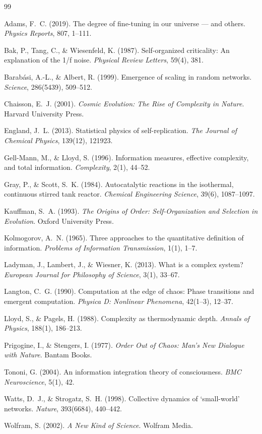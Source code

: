 \documentclass[12pt,a4paper]{article}
\begin{document}
\begin{thebibliography}{99}

Adams, F.~C. (2019).
The degree of fine-tuning in our universe — and others.
\textit{Physics Reports}, 807, 1--111.

Bak, P., Tang, C., \& Wiesenfeld, K. (1987).
Self-organized criticality: An explanation of the 1/f noise.
\textit{Physical Review Letters}, 59(4), 381.

Barab{\'a}si, A.-L., \& Albert, R. (1999).
Emergence of scaling in random networks.
\textit{Science}, 286(5439), 509--512.

Chaisson, E.~J. (2001).
\textit{Cosmic Evolution: The Rise of Complexity in Nature}.
Harvard University Press.

England, J.~L. (2013).
Statistical physics of self-replication.
\textit{The Journal of Chemical Physics}, 139(12), 121923.

Gell-Mann, M., \& Lloyd, S. (1996).
Information measures, effective complexity, and total information.
\textit{Complexity}, 2(1), 44--52.

Gray, P., \& Scott, S.~K. (1984).
Autocatalytic reactions in the isothermal, continuous stirred tank reactor.
\textit{Chemical Engineering Science}, 39(6), 1087--1097.

Kauffman, S.~A. (1993).
\textit{The Origins of Order: Self-Organization and Selection in Evolution}.
Oxford University Press.

Kolmogorov, A.~N. (1965).
Three approaches to the quantitative definition of information.
\textit{Problems of Information Transmission}, 1(1), 1--7.

Ladyman, J., Lambert, J., \& Wiesner, K. (2013).
What is a complex system?
\textit{European Journal for Philosophy of Science}, 3(1), 33--67.

Langton, C.~G. (1990).
Computation at the edge of chaos: Phase transitions and emergent computation.
\textit{Physica D: Nonlinear Phenomena}, 42(1--3), 12--37.

Lloyd, S., \& Pagels, H. (1988).
Complexity as thermodynamic depth.
\textit{Annals of Physics}, 188(1), 186--213.

Prigogine, I., \& Stengers, I. (1977).
\textit{Order Out of Chaos: Man's New Dialogue with Nature}.
Bantam Books.

Tononi, G. (2004).
An information integration theory of consciousness.
\textit{BMC Neuroscience}, 5(1), 42.

Watts, D.~J., \& Strogatz, S.~H. (1998).
Collective dynamics of `small-world' networks.
\textit{Nature}, 393(6684), 440--442.

Wolfram, S. (2002).
\textit{A New Kind of Science}.
Wolfram Media.

\end{thebibliography}
\end{document}
